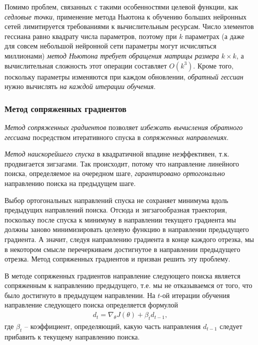 \documentclass[%
	11pt,
	a4paper,
	utf8,
]{article}
\begin{document}
Помимо проблем, связанных с такими особенностями целевой функции, как \emph{седловые точки}, применение метода Ньютона к обучению больших нейронных сетей лимитируется требованиями к вычислительным ресурсам. Число элементов гессиана равно квадрату числа параметров, поэтому при $ k $ параметрах (а даже для совсем небольшой нейронной сети параметры могут исчисляться миллионами) \emph{метод Ньютона требует обращения матрицы размера} $ k \times k $, а вычислительная сложность этот операции составляет {\color{blue}$ O(k^3) $}. {\color{red}Кроме того, поскольку параметры изменяются при каждом обновлении, \emph{обратный гессиан} нужно вычислять \emph{на каждой итерации обучения}}.

\subsubsection{Метод сопряженных градиентов}

\emph{Метод сопряженных градиентов} позволяет \emph{избежать вычисления обратного гессиана} посредством итеративного спуска в \emph{сопряженных направлениях}.

\emph{Метод наискорейшего спуска} в квадратичной впадине неэффективен, т.к. продвигается зигзагами. Так происходит, потому что направление линейного поиска, определяемое на очередном шаге, \emph{гарантировано ортогонально} направлению поиска на предыдущем шаге.

Выбор ортогональных направлений спуска не сохраняет минимума вдоль предыдущих направлений поиска. Отсюда и зигзагообразная траектория, поскольку после спуска к минимуму в направлении текущего градиента мы должны заново минимизировать целевую функцию в направлении предыдущего градиента. А значит, следуя направлению градиента в конце каждого отрезка, мы в некотором смысле перечеркиваем достигнутое в направлении предыдущего отрезка. Метод сопряженных градиентов и призван решить эту проблему.

В методе сопряженных градиентов направление следующего поиска является сопряженным к направлению предыдущего, т.е. мы не отказываемся от того, что было достигнуто в предыдущем направлении. На $ t $-ой итерации обучения направление следующего поиска определяется формулой
\begin{align*}
	d_t = \nabla_{\theta} J(\theta) + \beta_t d_{t-1},
\end{align*}
где $ \beta_t $ -- коэффициент, определяющий, какую часть направления $ d_{t-1} $ следует прибавить к текущему направлению поиска.
\end{document}
